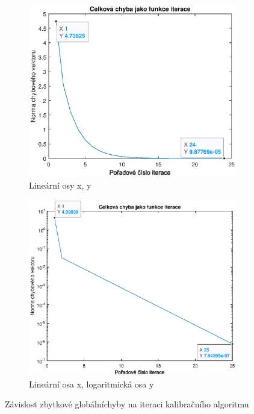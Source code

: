 \documentclass[twoside]{article}
\begin{document}
\begin{figure}[htbp]
	\centering
	\begin{subfigure}{0.45\linewidth}
		\includegraphics[width=\linewidth]{chyba.eps}
		\caption{Lineární osy x, y}
		\label{fig:chyba_lin}
	\end{subfigure}
	\begin{subfigure}{0.45\linewidth}
		\includegraphics[width=\linewidth]{chyba_semilog.eps}
		\caption{Lineární osa x, logaritmická osa y}
		\label{fig:chyba_log}
	\end{subfigure}
	\caption{Závislost zbytkové globálníchyby na iteraci kalibračního algoritmu}
	\label{fig:chyba}			
\end{figure}
\end{document}
